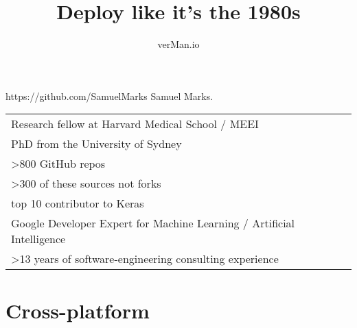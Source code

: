 \documentclass[aspectratio=169]{beamer}
\title{Deploy like it's the 1980s}
\author{verMan.io}
\date{}%
\begin{document}
\begin{frame}
  \titlepage
\end{frame}

\begin{frame}{https://github.com/SamuelMarks}
    \centering
  Samuel Marks.

  \vspace{2em}
  \centering
  \begin{center}
    \begin{tabular}{l}
        Research fellow at Harvard Medical School / MEEI \\
        PhD from the University of Sydney \\
        >800 GitHub repos \\
        >300 of these sources not forks \\
        top 10 contributor to Keras \\
        Google Developer Expert for Machine Learning / Artificial Intelligence \\
        >13 years of software-engineering consulting experience
    \end{tabular}
  \end{center}
  
\end{frame}

\section{Cross-platform}
\end{document}
